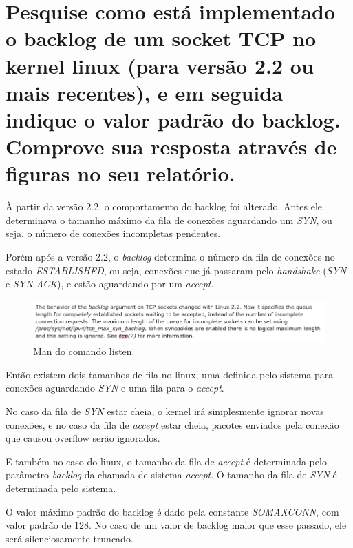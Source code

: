 \documentclass[12pt,a4paper]{report}
\begin{document}



\section{Pesquise como está implementado o backlog de um socket TCP no kernel linux (para
versão 2.2 ou mais recentes), e em seguida indique o valor padrão do backlog.
Comprove sua resposta através de figuras no seu relatório.}

À partir da versão 2.2, o comportamento do backlog foi alterado. Antes ele determinava o tamanho máximo da fila de conexões aguardando um \emph{SYN}, ou seja, o número de conexões incompletas pendentes.

Porém após a versão 2.2, o \emph{backlog} determina o número da fila de conexões no estado \emph{ESTABLISHED}, ou seja, conexões que já passaram pelo \emph{handshake} (\emph{SYN} e \emph{SYN ACK}), e estão aguardando por um \emph{accept}.

\begin{figure}[H]
  \includegraphics[width=\linewidth]{backlog-22.png}
  \caption{Man do comando listen.}
\end{figure}

Então existem dois tamanhos de fila no linux, uma definida pelo sistema para conexões aguardando \emph{SYN} e uma fila para o \emph{accept}.

No caso da fila de \emph{SYN} estar cheia, o kernel irá simplesmente ignorar novas conexões, e no caso da fila de \emph{accept} estar cheia, pacotes enviados pela conexão que causou overflow serão ignorados.

E também no caso do linux, o tamanho da fila de \emph{accept} é determinada pelo parâmetro \emph{backlog} da chamada de sistema \emph{accept}. O tamanho da fila de \emph{SYN} é determinada pelo sistema.

O valor máximo padrão do backlog é dado pela constante \emph{SOMAXCONN}, com valor padrão de 128. No caso de um valor de backlog maior que esse passado, ele será silenciosamente truncado.
\end{document}

